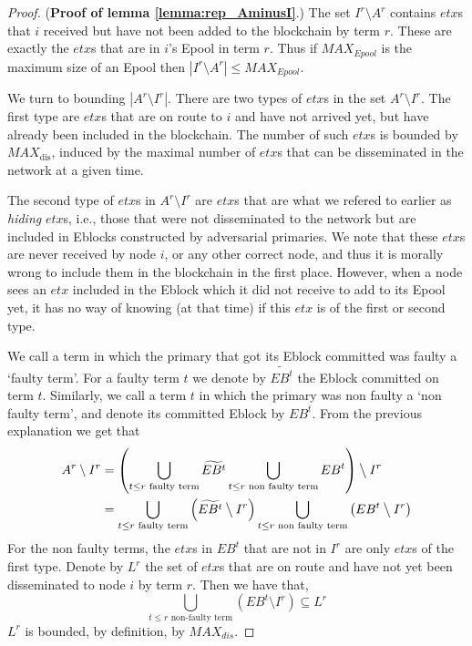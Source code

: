 \begin{proof}(\textbf{Proof of lemma \ref{lemma:rep_AminusI}}.)
The set $I^{r}\setminus A^r$ contains $etx$s that $i$ received but have not been added to the blockchain by term $r$. These are exactly the $etx$s that are in $i$'s Epool in term $r$. Thus if $MAX_{Epool}$ is the maximum size of an Epool then $|I^{r}\setminus A^r|\leq MAX_{Epool}$. 

We turn to bounding  $|A^{r}\setminus I^r|$.
There are two types of $etx$s in the set $A^r\setminus I^r$. The first type are $etx$s that are on route to $i$ and have not arrived yet, but have already been included in the blockchain. The number of such $etx$s is bounded by $MAX_\text{dis}$, induced by the maximal number of $etx$s that can be disseminated in the network at a given time. 

The second type of $etx$s in $A^r \setminus I^{r}$ are $etx$s that are what we refered to earlier as \textit{hiding} $etx$s, i.e., those that were not disseminated to the network but are included in Eblocks constructed by adversarial primaries. We note that these $etx$s are never received by node $i$, or any other correct node, and thus it is morally wrong to include them in the blockchain in the first place. However, when a node sees an $etx$ included in the Eblock which it did not receive to add to its Epool yet, it has no way of knowing (at that time) if this $etx$ is of the first or second type.  

We call a term in which the primary that got its Eblock committed was faulty a `faulty term'. For a faulty term $t$ we denote by $\widetilde{EB^t}$ the Eblock committed on term $t$. Similarly, we call a term $t$ in which the primary was non faulty a `non faulty term', and denote its committed Eblock by $EB^t$.  From  the previous explanation we get that
\begin{align}
A^r\setminus I^r &= \left(\bigcup_{t\leq r \text{ faulty term}}\widetilde{EB^t} \bigcup_{t\leq r \text{ non faulty term}} EB^t\right)\mathbin{\big\backslash} I^r\\
&= \bigcup_{t\leq r \text{ faulty term}} \left (\widetilde{EB^t} \mathbin{\big\backslash} I^r \right ) \bigcup_{t\leq r \text{ non faulty term}} \left (EB^t \mathbin{\big\backslash} I^r \right )\label{eq:rep_e}
\end{align}
For the non faulty terms, the $etx$s in $EB^t$ that are not in $I^r$ are only $etx$s of the first type. Denote by $L^r$ the set of $etx$s that are on route and have not yet been disseminated to node $i$ by term $r$. Then we have that,
\begin{equation} \label{eq:rep_nonfault}
\bigcup_{t\leq r \text{ non-faulty term}} \left (EB^t\setminus I^r \right )\subseteq L^r
\end{equation}
$L^r$ is bounded, by definition, by $MAX_{dis}$.


\end{proof}
